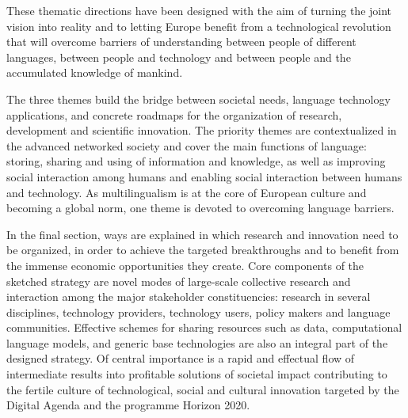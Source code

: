 \begin{multicols}{2}
These thematic directions have been designed with the aim of turning the joint vision into reality and to letting Europe benefit from a technological revolution that will overcome barriers of understanding between people of different languages, between people and technology and between people and the accumulated knowledge of mankind.

The three themes build the bridge between societal needs, language technology applications, and concrete roadmaps for the organization of research, development and scientific innovation. The priority themes are contextualized in the advanced networked society and cover the main functions of language: storing, sharing and using of information and knowledge, as well as improving social interaction among humans and enabling social interaction between humans and technology. As multilingualism is at the core of European culture and becoming a global norm, one theme is devoted to overcoming language barriers.

In the final section, ways are explained in which research and innovation need to be organized, in order to achieve the targeted breakthroughs and to benefit from the immense economic opportunities they create. Core components of the sketched strategy are novel modes of large-scale collective research and interaction among the major stakeholder constituencies: research in several disciplines, technology providers, technology users, policy makers and language communities. Effective schemes for sharing resources such as data, computational language models, and generic base technologies are also an integral part of the designed strategy. Of central importance is a rapid and effectual flow of intermediate results into profitable solutions of societal impact contributing to the fertile culture of technological, social and cultural innovation targeted by the Digital Agenda and the programme Horizon 2020.
\end{multicols}

\clearpage


